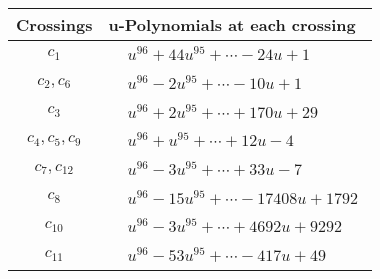 \documentclass[1p]{elsarticle_modified}
\theoremstyle{definition}
\begin{document}
\begin{tabular}{m{50pt}|m{274pt}}
Crossings & \hspace{64pt}u-Polynomials at each crossing \\
\hline $$\begin{aligned}c_{1}\end{aligned}$$&$\begin{aligned}
&u^{96}+44 u^{95}+\cdots-24 u+1
\end{aligned}$\\
\hline $$\begin{aligned}c_{2},c_{6}\end{aligned}$$&$\begin{aligned}
&u^{96}-2 u^{95}+\cdots-10 u+1
\end{aligned}$\\
\hline $$\begin{aligned}c_{3}\end{aligned}$$&$\begin{aligned}
&u^{96}+2 u^{95}+\cdots+170 u+29
\end{aligned}$\\
\hline $$\begin{aligned}c_{4},c_{5},c_{9}\end{aligned}$$&$\begin{aligned}
&u^{96}+u^{95}+\cdots+12 u-4
\end{aligned}$\\
\hline $$\begin{aligned}c_{7},c_{12}\end{aligned}$$&$\begin{aligned}
&u^{96}-3 u^{95}+\cdots+33 u-7
\end{aligned}$\\
\hline $$\begin{aligned}c_{8}\end{aligned}$$&$\begin{aligned}
&u^{96}-15 u^{95}+\cdots-17408 u+1792
\end{aligned}$\\
\hline $$\begin{aligned}c_{10}\end{aligned}$$&$\begin{aligned}
&u^{96}-3 u^{95}+\cdots+4692 u+9292
\end{aligned}$\\
\hline $$\begin{aligned}c_{11}\end{aligned}$$&$\begin{aligned}
&u^{96}-53 u^{95}+\cdots-417 u+49
\end{aligned}$\\
\hline
\end{tabular}\\~\\
\end{document}
